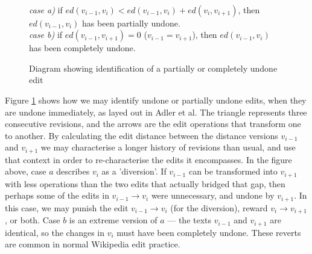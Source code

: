 \documentclass[a4paper,11pt,twoside,notitlepage]{article}
\begin{document}
        \begin{figure}[h]
          \centering
          \\
          \textit{case a)} if $ed(v_{i-1},v_i) < ed(v_{i-1},v_i) +
          ed(v_{i},v_{i+1})$, then $ed(v_{i-1},v_i)$ has been
          partially undone.\\ 
          \textit{case b)} if $ed(v_{i-1},v_{i+1}) = 0$
          ($v_{i-1} = v_{i+1}$), then $ed(v_{i-1},v_i)$ has been
          completely undone.
          \caption{Diagram showing identification of a partially or
            completely undone edit}
          \label{fig:undo}
        \end{figure}

        Figure \ref{fig:undo} shows how we may identify undone or
        partially undone edits, when they are undone immediately, as
        layed out in Adler et al.\cite{Adler2007} The triangle
        represents three consecutive revisions, and the arrows are the
        edit operations that transform one to another. By calculating
        the edit distance between the distance versions $v_{i-1}$ and
        $v_{i+1}$ we may characterise a longer history of revisions
        than usual, and use that context in order to re-characterise
        the edits it encompasses. In the figure above, case $a$
        describes $v_i$ as a 'diversion'. If $v_{i-1}$ can be
        transformed into $v_{i+1}$ with less operations than the two
        edits that actually bridged that gap, then perhaps some of the
        edits in $v_{i-1} \rightarrow v_i$ were unnecessary, and
        undone by $v_{i+1}$. In this case, we may punish the edit
        $v_{i-1} \rightarrow v_i$ (for the diversion), reward $v_{i}
        \rightarrow v_{i+1}$, or both. Case $b$ is an extreme version
        of $a$ --- the texts $v_{i-1}$ and $v_{i+1}$ are identical, so
        the changes in $v_i$ must have been completely undone. These
        reverts are common in normal Wikipedia edit
        practice.\cite{wiki-revert}
\end{document}
